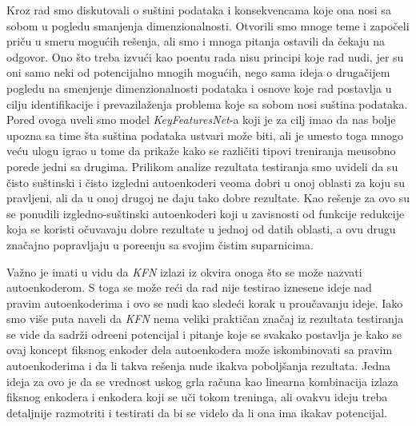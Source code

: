 \documentclass{article}
\begin{document}
	Kroz rad smo diskutovali o su\v stini podataka i konsekvencama koje ona nosi sa sobom u pogledu smanjenja dimenzionalnosti. 
	Otvorili smo mnoge teme i zapo\v celi pri\v cu u smeru mogu\'cih re\v senja, ali smo i mnoga pitanja ostavili da \v cekaju na odgovor.
	Ono \v sto treba izvu\'ci kao poentu rada nisu principi koje rad nudi, jer su oni samo neki od potencijalno mnogih mogu\'cih, nego sama ideja o druga\v cijem pogledu na smenjenje dimenzionalnosti podataka i osnove koje rad postavlja u cilju identifikacije i prevazila\v zenja problema koje sa sobom nosi su\v stina podataka.
	Pored ovoga uveli smo model \emph{KeyFeaturesNet}-a koji je za cilj imao da nas bolje upozna sa time \v sta su\v stina podataka ustvari mo\v ze biti, ali je umesto toga mnogo ve\'cu ulogu igrao u tome da prika\v ze kako se razli\v citi tipovi treniranja me\dj usobno porede jedni sa drugima.
	Prilikom analize rezultata testiranja smo uvideli da su \v cisto su\v stinski i \v cisto izgledni autoenkoderi veoma dobri u onoj oblasti za koju su pravljeni, ali da u onoj drugoj ne daju tako dobre rezultate.
	Kao re\v senje za ovo su se ponudili izgledno-su\v stinski autoenkoderi koji u zavisnosti od funkcije redukcije koja se koristi o\v cuvavaju dobre rezultate u jednoj od datih oblasti, a ovu drugu zna\v cajno popravljaju u pore\dj enju sa svojim \v cistim suparnicima.
	
	Va\v zno je imati u vidu da \emph{KFN} izlazi iz okvira onoga \v sto se mo\v ze nazvati autoenkoderom. 
	S toga se mo\v ze re\'ci da rad nije testirao iznesene ideje nad pravim autoenkoderima i ovo se nudi kao slede\'ci korak u prou\v cavanju ideje.
	Iako smo vi\v se puta naveli da \emph{KFN} nema veliki prakti\v can zna\v caj iz rezultata testiranja se vide da sadr\v zi odre\dj eni potencijal i pitanje koje se svakako postavlja je kako se ovaj koncept fiksnog enkoder dela autoenkodera mo\v ze iskombinovati sa pravim autoenkoderima i da li takva re\v senja nude ikakva pobolj\v sanja rezultata.
	Jedna ideja za ovo je da se vrednost uskog grla ra\v cuna kao linearna kombinacija izlaza fiksnog enkodera i enkodera koji se u\v ci tokom treninga, ali ovakvu ideju treba detaljnije razmotriti i testirati da bi se videlo da li ona ima ikakav potencijal.
	
	\pagebreak
	
	
\end{document}
